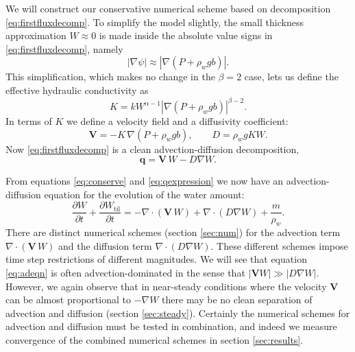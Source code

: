 \documentclass[gmd]{copernicus}   %
\newcommand{\text}{\textrm}
\newcommand\bV{\mathbf{V}}
\newcommand\bq{\mathbf{q}}
\newcommand{\Div}{\nabla\cdot}
\newcommand{\grad}{\nabla}
\newcommand{\Wtil}{W_{\text{til}}}
\begin{document}
We will construct our conservative numerical scheme based on decomposition \eqref{eq:firstfluxdecomp}.  To simplify the model slightly, the small thickness approximation $W\approx 0$ is made inside the absolute value signs in \eqref{eq:firstfluxdecomp}, namely
\begin{equation}
\left|\grad \psi\right| \approx \left|\grad \left(P + \rho_w g b \right)\right|.  \label{eq:Wsmall}
\end{equation}
This simplification, which makes no change in the $\beta=2$ case, lets us define the effective hydraulic conductivity as
\begin{equation}
K = k W^{\alpha-1} \left|\grad(P+\rho_w g b)\right|^{\beta - 2}. \label{eq:Kdefine}
\end{equation}
In terms of $K$ we define a velocity field and a diffusivity coefficient:
\begin{equation} \label{eq:vexpression}
  \bV = - K\, \grad \left(P + \rho_w g b\right), \qquad D = \rho_w g K W.
\end{equation}
Now \eqref{eq:firstfluxdecomp} is a clean advection-diffusion decomposition,
\begin{equation} \label{eq:qexpression}
  \bq = \bV\, W - D \grad W.
\end{equation}

From equations \eqref{eq:conserve} and \eqref{eq:qexpression} we now have an advection-diffusion equation \citep{HundsdorferVerwer2010} for the evolution of the water amount:
\begin{equation} \label{eq:adeqn}
  \frac{\partial W}{\partial t} + \frac{\partial \Wtil}{\partial t} = - \Div\left(\bV\, W\right) + \Div \left(D \grad W\right) + \frac{m}{\rho_w}.
\end{equation}
There are distinct numerical schemes (section \ref{sec:num}) for the advection term $\Div\left(\bV\, W\right)$ and the diffusion term $\Div \left(D \grad W\right)$.  These different schemes impose time step restrictions of different magnitudes.  We will see that equation \eqref{eq:adeqn} is often advection-dominated in the sense that $|\bV W| \gg |D \grad W|$.  However, we again observe that in near-steady conditions where the velocity $\bV$ can be almost proportional to $-\grad W$ there may be no clean separation of advection and diffusion (section \ref{sec:steady}).  Certainly the numerical schemes for advection and diffusion must be tested in combination, and indeed we measure convergence of the combined numerical schemes in section \ref{sec:results}.
\end{document}
